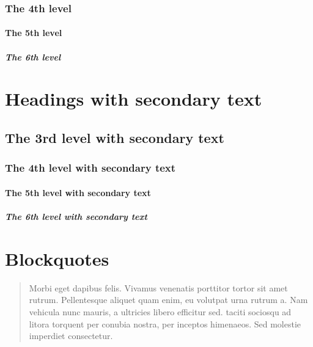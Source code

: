 \documentclass[letterpaper,10pt,english]{sphinxmanual}
\begin{document}
\subsubsection{The 4th level}
\label{\detokenize{markdown:the-4th-level}}

\paragraph{The 5th level}
\label{\detokenize{markdown:the-5th-level}}

\subparagraph{The 6th level}
\label{\detokenize{markdown:the-6th-level}}

\section{Headings with secondary text}
\label{\detokenize{markdown:headings-small-with-secondary-text-small}}

\subsection{The 3rd level with secondary text}
\label{\detokenize{markdown:the-3rd-level-small-with-secondary-text-small}}

\subsubsection{The 4th level with secondary text}
\label{\detokenize{markdown:the-4th-level-small-with-secondary-text-small}}

\paragraph{The 5th level with secondary text}
\label{\detokenize{markdown:the-5th-level-small-with-secondary-text-small}}

\subparagraph{The 6th level with secondary text}
\label{\detokenize{markdown:the-6th-level-small-with-secondary-text-small}}

\section{Blockquotes}
\label{\detokenize{markdown:blockquotes}}\begin{quote}

Morbi eget dapibus felis. Vivamus venenatis porttitor tortor sit amet rutrum.
Pellentesque aliquet quam enim, eu volutpat urna rutrum a. Nam vehicula nunc
mauris, a ultricies libero efficitur sed.  taciti sociosqu ad
litora torquent per conubia nostra, per inceptos himenaeos. Sed molestie
imperdiet consectetur.
\end{quote}
\end{document}
